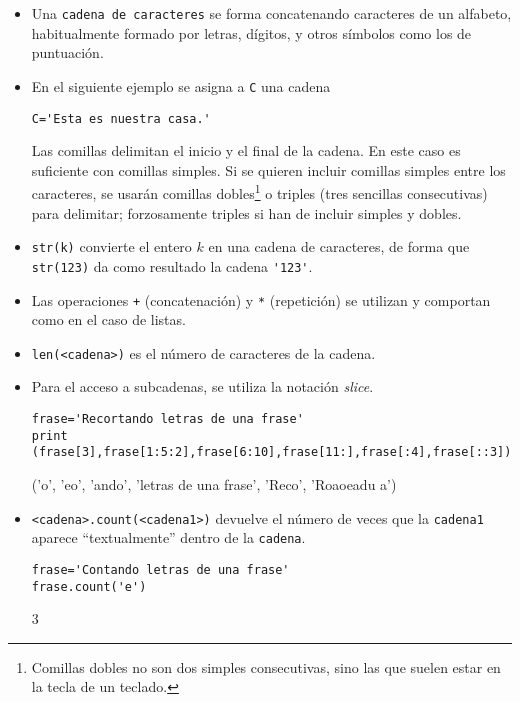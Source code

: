 \begin{itemize}
   
 \item Una {\tt cadena de caracteres} se forma
concatenando caracteres de un alfabeto, habitualmente formado por letras,
dígitos, y otros símbolos como los de puntuación. 

\item En el siguiente ejemplo se asigna a \lstinline|C| una cadena
\begin{lstlisting}[numbers=none]
C='Esta es nuestra casa.'
\end{lstlisting}
Las comillas delimitan el inicio y el final de la cadena. En este
caso es suficiente con comillas simples.
Si se quieren incluir comillas simples entre los caracteres, se usarán comillas
dobles\footnote{Comillas dobles no son dos simples consecutivas, sino las que
suelen
estar en la tecla  de un teclado.} o triples (tres sencillas
consecutivas) para
delimitar; forzosamente triples si han de incluir simples y dobles. 


\item  \lstinline|str(k)| convierte el entero $k$ en una cadena de caracteres,
de
forma que \lstinline|str(123)| da como resultado la cadena {\lstinline|'123'|}. 

\item Las operaciones \lstinline|+| (concatenación) y \lstinline|*| (repetición)
se
utilizan y comportan como en el caso de listas.

\item  \lstinline|len(<cadena>)| es el número de caracteres de la cadena.

\item Para el acceso a subcadenas, se utiliza la notación \emph{slice}.
\begin{lstlisting}
frase='Recortando letras de una frase'
print (frase[3],frase[1:5:2],frase[6:10],frase[11:],frase[:4],frase[::3])
\end{lstlisting}
\begin{Output}
	('o', 'eo', 'ando', 'letras de una frase', 'Reco', 'Roaoeadu a')
\end{Output}

\item \lstinline|<cadena>.count(<cadena1>)| devuelve el número de veces que la
\lstinline|cadena1|  aparece ``textualmente'' dentro de la \lstinline|cadena|.
\begin{lstlisting}
frase='Contando letras de una frase'
frase.count('e')
\end{lstlisting}
\begin{Output}
	3
\end{Output}


\end{itemize}
